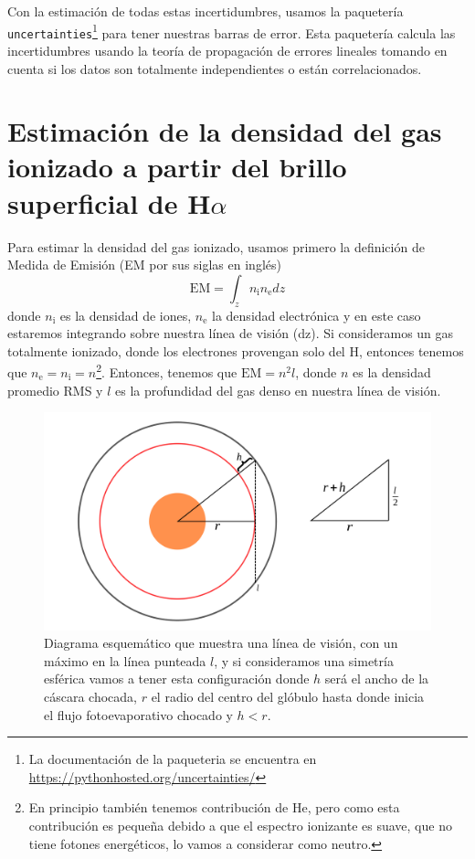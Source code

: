 \documentclass{book}
\begin{document}
Con la estimación de todas estas incertidumbres, usamos la paquetería \verb|uncertainties|\footnote{La documentación de la paqueteria se encuentra en \url{https://pythonhosted.org/uncertainties/}} para tener nuestras barras de error. Esta paquetería calcula las incertidumbres usando la teoría de propagación de errores lineales tomando en cuenta si los datos son totalmente independientes o están correlacionados.

\section{\boldmath Estimación de la densidad del gas ionizado a partir del brillo superficial de H$\alpha$}\label{Sec : estimacion de densidad}

Para estimar la densidad del gas ionizado, usamos primero la definición de Medida de Emisión (EM por sus siglas en inglés)
\begin{equation}
\mathrm{EM}=\int_z n_\mathrm{i} n_\mathrm{e}dz    
\end{equation}
donde $n_\mathrm{i}$ es la densidad de iones, $n_\mathrm{e}$ la densidad electrónica y en este caso estaremos integrando sobre nuestra línea de visión (dz). Si consideramos un gas totalmente ionizado, donde los electrones provengan solo del H, entonces tenemos que $n_\mathrm{e}=n_\mathrm{i}=n$\footnote{En principio también tenemos contribución de He, pero como esta contribución es pequeña debido a que el espectro ionizante es suave, que no tiene fotones energéticos, lo vamos a considerar como neutro.}. Entonces, tenemos que $\mathrm{EM}=n^2l$, donde $n$ es la densidad promedio RMS y $l$ es la profundidad del gas denso en nuestra línea de visión.
 
\begin{figure}[htb]
    \centering    \includegraphics[width=\textwidth]{artesanales/ImgFi01-4.pdf}
    \caption{Diagrama esquemático que muestra una línea de visión, con un máximo en la línea punteada $l$, y si consideramos una simetría esférica vamos a tener esta configuración donde $h$ será el ancho de la cáscara chocada, $r$ el radio del centro del glóbulo hasta donde inicia el flujo fotoevaporativo chocado y $h<r$.}
    \label{fig:EM}
\end{figure}
\end{document}
